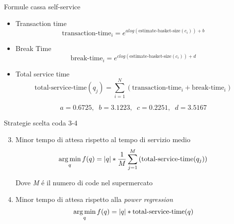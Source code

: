 \begin{frame}{Formule cassa self-service}
  \begin{itemize}
  \item Transaction time
    \begin{equation}
      \text{transaction-time}_i = e^{a log(\text{estimate-basket-size}(c_i)) + b}
\end{equation}
    
\item Break Time
  \begin{equation}
    \text{break-time}_i = e^{c log(\text{estimate-basket-size}(c_i)) + d}
  \end{equation}
\item Total service time
  \begin{equation}
    \text{total-service-time}(q_j) = \sum\limits_{i=1}^N \left( \text{transaction-time}_i + \text{break-time}_i \right)
  \end{equation}

  \begin{equation}
    a = 0.6725, \;\; b = 3.1223, \;\; c = 0.2251, \;\; d = 3.5167
  \end{equation}
  
\end{itemize}  
\end{frame}

\begin{frame}{Strategie scelta coda 3-4}
  \begin{enumerate}
    \setcounter{enumi}{2}

  \item Minor tempo di attesa rispetto al tempo di servizio medio
    \begin{equation}
      \operatorname*{arg\,min}_q f(q) = |q| * \frac{1}{M}\sum\limits_{j=1}^M \left( \text{total-service-time}(q_j) \right)
    \end{equation}

    Dove \textit{M} é il numero di code nel supermercato
    
\item Minor tempo di attesa rispetto alla \textit{power regression}
  \begin{equation}
    \operatorname*{arg\,min}_q f(q) = |q| * \text{total-service-time}(q)
  \end{equation}
\end{enumerate}
\end{frame}


